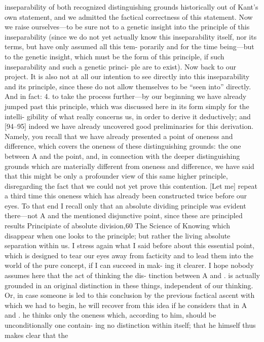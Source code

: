 inseparability of both recognized distinguishing grounds historically out
of Kant’s own statement, and we admitted the factical correctness of this
statement.
Now we raise ourselves—to be sure not to a genetic insight
into the principle of this inseparability (since we do not yet actually know
this inseparability itself, nor its terms, but have only assumed all this tem-
porarily and for the time being—but to the genetic insight, which must be
the form of this principle, if such inseparability and such a genetic princi-
ple are to exist).
Now back to our project.
It is also not at all our intention to see directly
into this inseparability and its principle, since these do not allow themselves
to be “seen into” directly.
And in fact:
4.
to take the process further—by our beginning we have already jumped past
this principle, which was discussed here in its form simply for the intelli-
gibility of what really concerns us, in order to derive it deductively; and
[94–95] indeed we have already uncovered good preliminaries for this
derivation.
Namely, you recall that we have already presented a point of
oneness and difference, which covers the oneness of these distinguishing
grounds: the one between A and the point, and, in connection with the
deeper distinguishing grounds which are materially different from oneness
and difference, we have said that this might be only a profounder view of
this same higher principle, disregarding the fact that we could not yet prove
this contention.
[Let me] repeat a third time this oneness which has already been
constructed twice before our eyes.
To that end I recall only that an absolute
dividing principle was evident there—not A and the mentioned disjunctive
point, since these are principled results {Principiate} of absolute division,60
The Science of Knowing
which disappear when one looks to the principle; but rather the living
absolute separation within us.
I stress again what I said before about this
essential point, which is designed to tear our eyes away from facticity and
to lead them into the world of the pure concept, if I can succeed in mak-
ing it clearer.
I hope nobody assumes here that the act of thinking the dis-
tinction between A and .
is actually grounded in an original distinction in
these things, independent of our thinking.
Or, in case someone is led to this
conclusion by the previous factical ascent with which we had to begin, he
will recover from this idea if he considers that in A and .
he thinks only the
oneness which, according to him, should be unconditionally one contain-
ing no distinction within itself; that he himself thus makes clear that the
